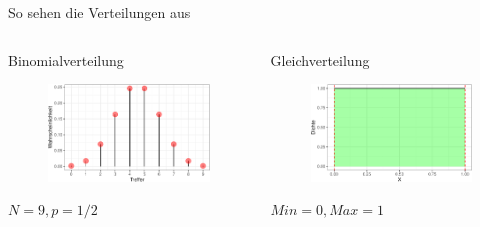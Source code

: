 \documentclass[
  ngerman,
  ignorenonframetext,
]{beamer}
\begin{document}
\begin{frame}{So sehen die Verteilungen aus}
\protect\hypertarget{so-sehen-die-verteilungen-aus}{}
\begin{columns}[T]
\begin{column}{0.5\textwidth}
\begin{block}{Binomialverteilung}
\protect\hypertarget{binomialverteilung}{}
\begin{figure}[H]
\includegraphics[width=0.7\linewidth]{unnamed-chunk-25-1} \end{figure}

\(N=9, p = 1/2\)
\end{block}
\end{column}

\begin{column}{0.5\textwidth}
\begin{block}{Gleichverteilung}
\protect\hypertarget{gleichverteilung}{}
\begin{figure}[H]
\includegraphics[width=0.7\linewidth]{unnamed-chunk-26-1} \end{figure}

\(Min = 0, Max = 1\)
\end{block}
\end{column}
\end{columns}
\end{frame}
\end{document}
